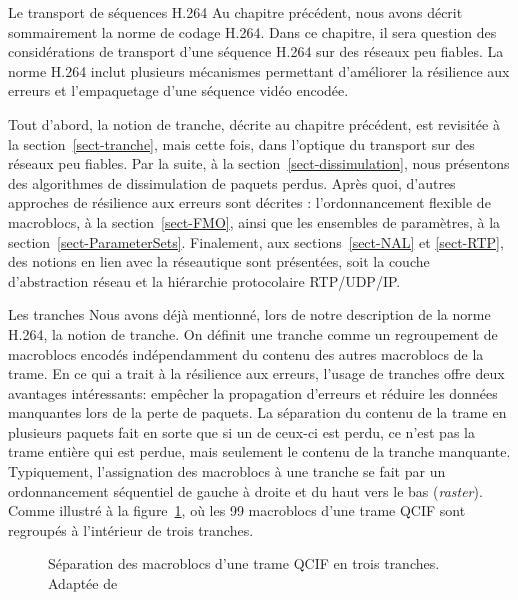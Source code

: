 \documentclass[letterpaper, twoside, 12pt,memoire]{thETS}
\newcommand{\ang}[1]{(\textit{#1})}
\newcommand{\fig}[1]{figure~\ref{#1}}
\newcommand{\sect}[1]{section~\ref{#1}}
\begin{document}
\begin{chapter}{Le transport de séquences H.264}
Au chapitre précédent, nous avons décrit sommairement la norme de codage H.264.
Dans ce chapitre, il sera question des considérations de transport d'une
séquence H.264 sur des réseaux peu fiables. La norme H.264 inclut plusieurs
mécanismes permettant d'améliorer la résilience aux erreurs et l'empaquetage
d'une séquence vidéo encodée.

Tout d'abord, la notion de tranche, décrite au chapitre précédent, est
revisitée à la \sect{sect-tranche}, mais cette fois, dans l'optique du
transport sur des réseaux peu fiables. Par la suite, à la
\sect{sect-dissimulation}, nous présentons des algorithmes de dissimulation de
paquets perdus. Après quoi, d'autres approches de résilience aux erreurs sont
décrites : l'ordonnancement flexible de macroblocs, à la \sect{sect-FMO}, ainsi que les
ensembles de paramètres, à la \sect{sect-ParameterSets}. Finalement, aux
sections~\ref{sect-NAL} et \ref{sect-RTP}, des notions en lien avec la
réseautique sont présentées, soit la couche d'abstraction réseau et la
hiérarchie protocolaire RTP/UDP/IP.


\begin{section}{Les tranches}
\label{sect-tranche}
Nous avons déjà mentionné, lors de notre description de la norme H.264, la
notion de tranche. On définit une tranche comme un regroupement de macroblocs encodés indépendamment du
contenu des autres macroblocs de la trame. En ce qui a trait à la résilience aux
erreurs, l'usage de tranches offre deux avantages intéressants: empêcher la
propagation d'erreurs et réduire les données manquantes lors de la perte de
paquets. La séparation du contenu de la trame en plusieurs paquets fait en sorte
que si un de ceux-ci est perdu, ce n'est pas la trame entière qui est perdue,
mais seulement le contenu de la tranche manquante. Typiquement, l'assignation
des macroblocs à une tranche se fait par un ordonnancement séquentiel de gauche
à droite et du haut vers le bas \ang{raster}. Comme illustré à la
\fig{fig-Tranches}, où les 99 macroblocs d'une trame QCIF sont regroupés à
l'intérieur de trois tranches.

\begin{figure}[htb] \centering

\caption{Séparation des macroblocs d'une trame QCIF en trois tranches.\\Adaptée
de \citet[p.~556]{wiegand2003}}
\label{fig-Tranches}
\end{figure}


\end{section}
\end{chapter}
\end{document}

